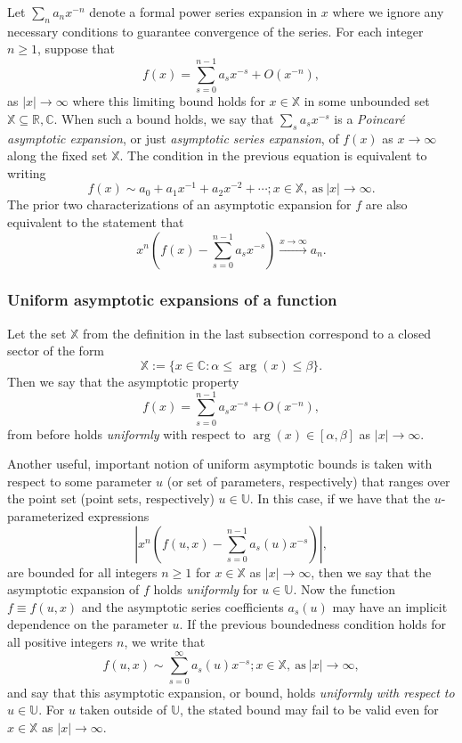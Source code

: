 \documentclass[11pt,reqno,a4letter]{article}
\numberwithin{figure}{section}
\numberwithin{table}{section}
\theoremstyle{plain}
\numberwithin{theorem}{section}
\theoremstyle{definition}
\begin{document}
Let $\sum_{n} a_n x^{-n}$ denote a formal power series expansion in $x$ where we 
ignore any necessary conditions to guarantee convergence of the series. For each integer $n \geq 1$, suppose that 
\[
f(x) = \sum_{s=0}^{n-1} a_s x^{-s} + O(x^{-n}), 
\]
as $|x| \rightarrow \infty$ where this limiting bound holds for $x \in \mathbb{X}$ in some unbounded set 
$\mathbb{X} \subseteq \mathbb{R}, \mathbb{C}$. 
When such a bound holds, we say that $\sum_s a_s x^{-s}$ is a \emph{Poincar\'{e} asymptotic expansion}, 
or just \emph{asymptotic series expansion}, of $f(x)$ as $x \rightarrow \infty$ along the fixed set $\mathbb{X}$. 
The condition in the previous equation is equivalent to writing 
\[
f(x) \sim a_0 + a_1 x^{-1} + a_2 x^{-2} + \cdots; x \in \mathbb{X}, \mathrm{\ as \ } |x| \rightarrow \infty. 
\]
The prior two characterizations of an asymptotic expansion for $f$ are also equivalent to the 
statement that 
\[
x^n \left(f(x) - \sum_{s=0}^{n-1} a_s x^{-s}\right) \xrightarrow{x \rightarrow \infty} a_n. 
\] 

\subsubsection{Uniform asymptotic expansions of a function} 

Let the set $\mathbb{X}$ from the definition in the last subsection correspond to a 
closed sector of the form 
$$\mathbb{X} := \{x \in \mathbb{C}: \alpha \leq \operatorname{arg}(x) \leq \beta\}.$$ 
Then we say that the asymptotic property 
\[
f(x) = \sum_{s=0}^{n-1} a_s x^{-s} + O(x^{-n}), 
\]
from before holds \emph{uniformly} with respect to $\operatorname{arg}(x) \in [\alpha, \beta]$ as 
$|x| \rightarrow \infty$. 

Another useful, important notion of uniform asymptotic bounds is taken with respect to some parameter $u$ 
(or set of parameters, respectively) that ranges over the point set (point sets, respectively) 
$u \in \mathbb{U}$. In this case, if we have that the $u$-parameterized expressions 
\[
\left\lvert x^n\left(f(u, x) - \sum_{s=0}^{n-1} a_s(u) x^{-s}\right) \right\rvert, 
\]
are bounded for all integers $n \geq 1$ for $x \in \mathbb{X}$ as $|x| \rightarrow \infty$, then we say that 
the asymptotic expansion of $f$ holds \emph{uniformly} for $u \in \mathbb{U}$. 
Now the function $f \equiv f(u, x)$ and the 
asymptotic series coefficients $a_s(u)$ may have an implicit dependence on the parameter $u$. 
If the previous boundedness condition holds for all positive integers $n$, we write that 
\[
f(u, x) \sim \sum_{s=0}^{\infty} a_s(u) x^{-s}; x \in \mathbb{X}, \mathrm{\ as \ } |x| \rightarrow \infty, 
\]
and say that this asymptotic expansion, or bound, holds \emph{uniformly with respect to $u \in \mathbb{U}$}. 
For $u$ taken outside of $\mathbb{U}$, the stated bound may fail to be valid even for $x \in \mathbb{X}$ as 
$|x| \rightarrow \infty$. 
\end{document}
